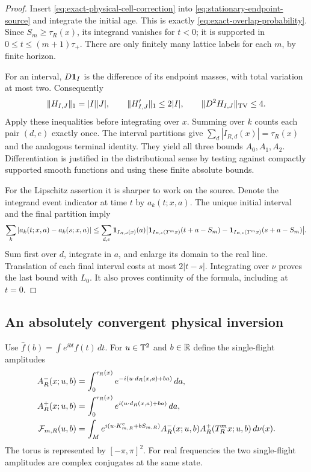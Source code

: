 \begin{proof}
Insert \eqref{eq:exact-physical-cell-correction} into
\eqref{eq:stationary-endpoint-source} and integrate the initial age.
This is exactly \eqref{eq:exact-overlap-probability}. Since
$S_m\ge\tau_R(x)$, its integrand vanishes for $t<0$; it is supported
in $0\le t\le(m+1)\tau_+$. There are only finitely many lattice
labels for each $m$, by finite horizon.

For an interval, $D\mathbf1_I$ is the difference of its endpoint masses,
with total variation at most two. Consequently
\[
 \|H_{I,J}\|_1=|I||J|,\qquad
 \|H'_{I,J}\|_1\le2|I|,\qquad
 \|D^2H_{I,J}\|_{\operatorname{TV}}\le4.
\]
Apply these inequalities before integrating over $x$. Summing over
$k$ counts each pair $(d,e)$ exactly once. The interval partitions give
$\sum_d|I_{R,d}(x)|=\tau_R(x)$ and the analogous terminal identity.
They yield all three bounds $A_0,A_1,A_2$. Differentiation is justified
in the distributional sense by testing against compactly supported
smooth functions and using these finite absolute bounds.

For the Lipschitz assertion it is sharper to work on the source.
Denote the integrand event indicator at time $t$ by $a_k(t;x,a)$.
The unique initial interval and the final partition imply
\begin{align*}
 \sum_k|a_k(t;x,a)-a_k(s;x,a)|
 \le \sum_{d,e}\mathbf1_{I_{R,d}(x)}(a)
 \big|\mathbf1_{I_{R,e}(T^mx)}(t+a-S_m)
       -\mathbf1_{I_{R,e}(T^mx)}(s+a-S_m)\big|.
\end{align*}
Sum first over $d$, integrate in $a$, and enlarge its domain to the
real line. Translation of each final interval costs at most $2|t-s|$.
Integrating over $\nu$ proves the last bound with $L_0$. It also proves
continuity of the formula, including at $t=0$.
\end{proof}

\subsection{An absolutely convergent physical inversion}
Use $\widehat f(b)=\int e^{ibt}f(t)\,dt$. For $u\in\mathbb T^2$ and
$b\in\mathbb R$ define the single-flight amplitudes
\begin{align}
 A^-_R(x;u,b)&=\int_0^{\tau_R(x)}
           e^{-i(u\cdot d_R(x,a)+ba)}\,da,\notag\\
 A^+_R(x;u,b)&=\int_0^{\tau_R(x)}
           e^{ i(u\cdot d_R(x,a)+ba)}\,da,
                                    \label{eq:single-flight-amplitudes}\\
 \mathcal F_{m,R}(u,b)&=\int_M
 e^{i(u\cdot K^{\rm c}_{m,R}+bS_{m,R})}
 A^-_R(x;u,b)A^+_R(T_R^mx;u,b)\,d\nu(x).
                                    \label{eq:stationary-physical-transform}
\end{align}
The torus is represented by $[-\pi,\pi]^2$. For real frequencies the
two single-flight amplitudes are complex conjugates at the same state.

